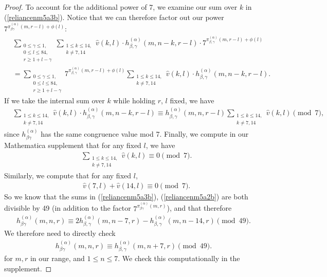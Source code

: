 \documentclass[reqno]{amsart}
\theoremstyle{definition}
\theoremstyle{remark}
\numberwithin{equation}{section}
\begin{document}
\begin{proof}
To account for the additional power of 7, we examine our sum over $k$ in (\ref{reliancenm5a3b}).  Notice that we can therefore factor out our power $7^{\pi^{(\alpha)}_{\beta\gamma}(m,r-l)+\phi(l)}$:
\begin{align*}
&\sum_{\substack{0\le\gamma\le 1,\\ 0\le l\le 84,\\ r\ge 1+l-\gamma}}\sum_{\substack{1\le k\le 14,\\ k\neq 7,14}} \hat{v}(k,l)\cdot h^{(\alpha)}_{\beta,\gamma}(m,n-k,r-l)\cdot 7^{\pi^{(\alpha)}_{\beta,\gamma}(m,r-l) + \phi(l)}\\
&=\sum_{\substack{0\le\gamma\le 1,\\ 0\le l\le 84,\\ r\ge 1+l-\gamma}} 7^{\pi^{(\alpha)}_{\beta,\gamma}(m,r-l) + \phi(l)} \sum_{\substack{1\le k\le 14,\\ k\neq 7,14}} \hat{v}(k,l)\cdot h^{(\alpha)}_{\beta,\gamma}(m,n-k,r-l).
\end{align*}  If we take the internal sum over $k$ while holding $r$, $l$ fixed, we have
\begin{align*}
&\sum_{\substack{1\le k\le 14,\\ k\neq 7,14}} \hat{v}(k,l)\cdot h^{(\alpha)}_{\beta,\gamma}(m,n-k,r-l) \equiv h^{(\alpha)}_{\beta,\gamma}(m,n,r-l) \sum_{\substack{1\le k\le 14,\\ k\neq 7,14}} \hat{v}(k,l)\pmod{7},
\end{align*} since $h^{(\alpha)}_{\beta\gamma}$ has the same congruence value mod 7. Finally, we compute in our Mathematica supplement that for any fixed $l$, we have
\begin{align*}
&\sum_{\substack{1\le k\le 14,\\ k\neq 7,14}} \hat{v}(k,l)\equiv 0 \pmod{7}.
\end{align*}  Similarly, we compute that for any fixed $l$,
\begin{align*}
&\hat{v}(7,l)+\hat{v}(14,l)\equiv 0 \pmod{7}.
\end{align*}  So we know that the sums in (\ref{reliancenm5a3b}), (\ref{reliancenm5a2b}) are both divisible by 49 (in addition to the factor $7^{\pi^{(\alpha)}_{\beta\gamma}(m,r)}$), and that therefore
\begin{align*}
h^{(\alpha)}_{\beta\gamma}(m,n,r)\equiv 2 h^{(\alpha)}_{\beta,\gamma}(m,n-7,r) - h^{(\alpha)}_{\beta,\gamma}(m,n-14,r)\pmod{49}.
\end{align*}  We therefore need to directly check 
\begin{align*}
h^{(\alpha)}_{\beta\gamma}(m,n,r)\equiv h^{(\alpha)}_{\beta,\gamma}(m,n+7,r)\pmod{49}.
\end{align*} for $m,r$ in our range, and $1\le n\le 7$.  We check this computationally in the supplement.
\end{proof}
\end{document}
